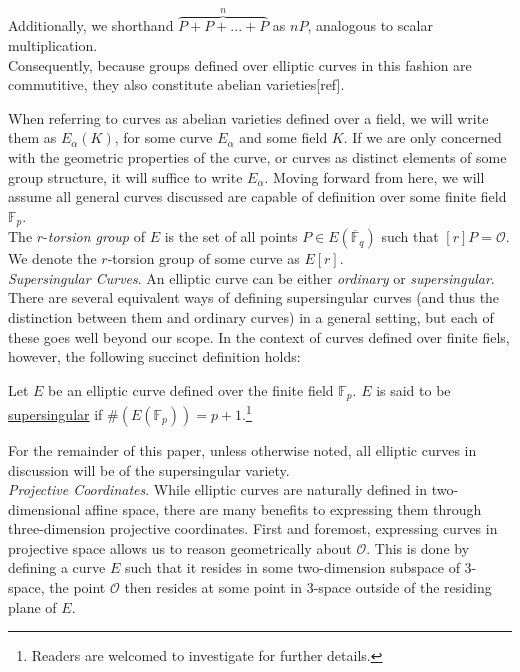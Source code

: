 Additionally, we shorthand $\overbrace{P + P + ... + P}^{n}$ as $nP$, analogous to scalar multiplication.\\

Consequently, because groups defined over elliptic curves in this fashion are commutitive, they also constitute abelian varieties[ref].

When referring to curves as abelian varieties defined over a field, we will write them as $E_{\alpha}(K)$, for some curve $E_{\alpha}$ and some field $K$. If we are only concerned with the geometric properties of the curve, or curves as distinct elements of some group structure, it will suffice to write $E_{\alpha}$. Moving forward from here, we will assume all general curves discussed are capable of definition over some finite field $\mathbb{F}_p$.\\

The $r$-\emph{torsion group} of $E$ is the set of all points $P \in E(\overline{\mathbb{F}}_q)$ such that $[r]P = \mathcal{O}$. We denote the $r$-torsion group of some curve as $E[r]$.\\

\noindent
\emph{Supersingular Curves}. An elliptic curve can be either \emph{ordinary} or \emph{supersingular}. There are several equivalent ways of defining supersingular curves (and thus the distinction between them and ordinary curves) in a general setting, but each of these goes well beyond our scope. In the context of curves defined over finite fiels, however, the following succinct definition holds:
\begin{tcolorbox}
\begin{definition}
\label{defn:supersingular}
Let $E$ be an elliptic curve defined over the finite field $\mathbb{F}_{p}$. $E$ is said to be \underline{supersingular} if $\#(E(\mathbb{F}_{p})) = p+1$.\footnote{Readers are welcomed to investigate \cite{pairings} for further details.}
\end{definition}
\end{tcolorbox}

For the remainder of this paper, unless otherwise noted, all elliptic curves in discussion will be of the supersingular variety.\\ 

\noindent
\emph{Projective Coordinates}\label{snip:projspace}. While elliptic curves are naturally defined in two-dimensional affine space, there are many benefits to expressing them through three-dimension projective coordinates. First and foremost, expressing curves in projective space allows us to reason geometrically about $\mathcal{O}$. This is done by defining a curve $E$ such that it resides in some two-dimension subspace of 3-space, the point $\mathcal{O}$ then resides at some point in 3-space outside of the residing plane of $E$. 


